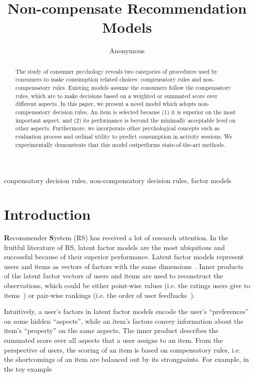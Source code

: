 \documentclass[conference]{IEEEtran}
\begin{document}
\title{Non-compensate Recommendation Models
}

\author{Anonymous
}

\maketitle

\begin{abstract}
The study of consumer psychology reveals two categories of procedures used by consumers to make consumption related choices: compensatory rules and non-compensatory rules. Existing models assume the consumers follow the compensatory rules, which are to make decisions based on a weighted or summated score over different aspects. In this paper, we present a novel model which adopts non-compensatory decision rules. An item is selected because  (1) it is superior on the most important aspect, and (2) its performance is beyond the minimally acceptable level on other aspects. Furthermore, we incorporate other psychological concepts such as evaluation process and ordinal utility to predict consumption in activity sessions. We experimentally demonstrate that this model outperforms state-of-the-art methods.
\end{abstract}

\begin{IEEEkeywords}
conpensatory decision rules, non-compensatory decision rules, factor models 
\end{IEEEkeywords}

\section{Introduction}\label{sec:introduction}
\textbf{R}ecommender \textbf{S}ystem (RS) has received a lot of research attention. In the fruitful literature of RS, latent factor models are the most ubiquitous and successful  because of their superior performance. Latent factor models represent users and items as vectors of factors with the same dimensions~\cite{Gopalan2015Scalable,Hu2008Collaborative}. Inner products of the latent factor vectors of users and items are used to reconstruct the observations, which could be either point-wise values (i.e. the ratings users give to items~\cite{}) or pair-wise rankings (i.e. the order of user feedbacks~\cite{}).


Intuitively, a user's factors in latent factor models encode the user's ``preferences'' on some hidden ``aspects'', while an item's factors convey information about the item's ``property'' on the same aspects. The inner product describes the summated score over all aspects that a user assigns to an item. From the perspective of users, the scoring of an item is based on compensatory rules, i.e. the shortcomings of an item are balanced out by its strongpoints. For example, in the toy example 
\end{document}
